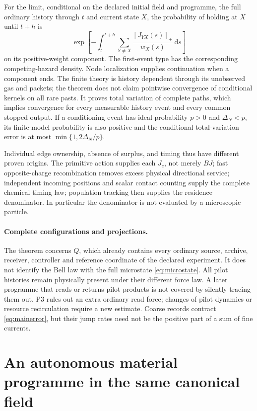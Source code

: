 \documentclass[11pt]{article}
\theoremstyle{definition}\newtheorem{definition}[theorem]{Definition}
\theoremstyle{remark}\newtheorem{remark}[theorem]{Remark}
\newcommand{\dd}{\,\mathrm d}\newcommand{\Var}{\operatorname{Var}}
\begin{document}
For the limit, conditional on the declared initial field and programme, the full ordinary history through $t$ and current state $X$, the probability of holding at $X$ until $t+h$ is
\begin{equation}
 \exp\left[-\int_t^{t+h}\sum_{Y\ne X}\frac{[J_{YX}(s)]_+}{w_X(s)}\dd s\right]
 \label{eq:survival}
\end{equation}
on its positive-weight component. The first-event type has the corresponding competing-hazard density. Node localization supplies continuation when a component ends. The finite theory is history dependent through its unobserved gas and packets; the theorem does not claim pointwise convergence of conditional kernels on all rare pasts. It proves total variation of complete paths, which implies convergence for every measurable history event and every common stopped output. If a conditioning event has ideal probability $p>0$ and $\Delta_N<p$, its finite-model probability is also positive and the conditional total-variation error is at most $\min\{1,2\Delta_N/p\}$.

Individual edge ownership, absence of surplus, and timing thus have different proven origins. The primitive action supplies each $J_e$, not merely $BJ$; fast opposite-charge recombination removes excess physical directional service; independent incoming positions and scalar contact counting supply the complete chemical timing law; population tracking then supplies the residence denominator. In particular the denominator is not evaluated by a microscopic particle.

\paragraph{Complete configurations and projections.}
The theorem concerns $Q$, which already contains every ordinary source, archive, receiver, controller and reference coordinate of the declared experiment. It does not identify the Bell law with the full microstate \eqref{eq:microstate}. All pilot histories remain physically present under their different force law. A later programme that reads or returns pilot products is not covered by silently tracing them out. P3 rules out an extra ordinary read force; changes of pilot dynamics or resource recirculation require a new estimate. Coarse records contract \eqref{eq:mainerror}, but their jump rates need not be the positive part of a sum of fine currents.

\section{An autonomous material programme in the same canonical field}
\label{mat:section}
\end{document}
